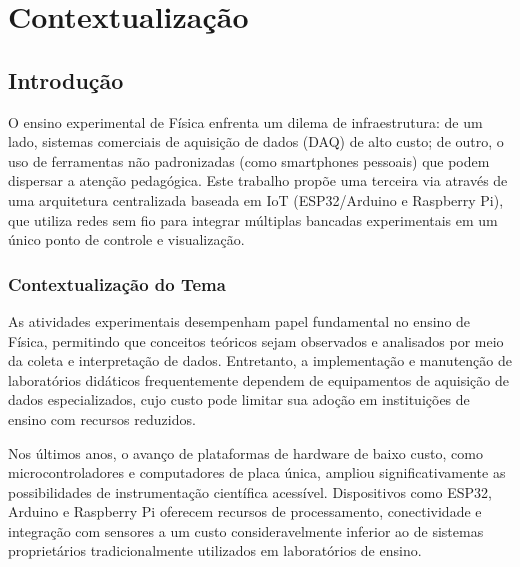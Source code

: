 \chapter{Contextualização}

\section{Introdução}
O ensino experimental de Física enfrenta um dilema de infraestrutura: de um lado, sistemas comerciais de aquisição de dados (DAQ) de alto custo; de outro, o uso de ferramentas não padronizadas (como smartphones pessoais) que podem dispersar a atenção pedagógica. Este trabalho propõe uma terceira via através de uma arquitetura centralizada baseada em IoT (ESP32/Arduino e Raspberry Pi), que utiliza redes sem fio para integrar múltiplas bancadas experimentais em um único ponto de controle e visualização.

\subsection{Contextualização do Tema}

As atividades experimentais desempenham papel fundamental no ensino de Física, permitindo que conceitos teóricos sejam observados e analisados por meio da coleta e interpretação de dados. Entretanto, a implementação e manutenção de laboratórios didáticos frequentemente dependem de equipamentos de aquisição de dados especializados, cujo custo pode limitar sua adoção em instituições de ensino com recursos reduzidos.

Nos últimos anos, o avanço de plataformas de hardware de baixo custo, como microcontroladores e computadores de placa única, ampliou significativamente as possibilidades de instrumentação científica acessível. Dispositivos como ESP32, Arduino e Raspberry Pi oferecem recursos de processamento, conectividade e integração com sensores a um custo consideravelmente inferior ao de sistemas proprietários tradicionalmente utilizados em laboratórios de ensino.

